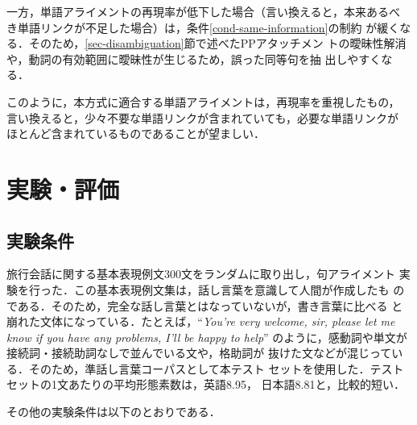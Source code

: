 一方，単語アライメントの再現率が低下した場合（言い換えると，本来あるべ
き単語リンクが不足した場合）は，条件\ref{cond-same-information}の制約
が緩くなる．そのため，\ref{sec-disambiguation}節で述べたPPアタッチメン
トの曖昧性解消や，動詞の有効範囲に曖昧性が生じるため，誤った同等句を抽
出しやすくなる．

このように，本方式に適合する単語アライメントは，再現率を重視したもの，
言い換えると，少々不要な単語リンクが含まれていても，必要な単語リンクが
ほとんど含まれているものであることが望ましい．


\section{実験・評価}
\label{sec-eval-alignment}

\subsection{実験条件}

旅行会話に関する基本表現例文300文をランダムに取り出し，句アライメント
実験を行った．この基本表現例文集は，話し言葉を意識して人間が作成したも
のである．そのため，完全な話し言葉とはなっていないが，書き言葉に比べる
と崩れた文体になっている．たとえば，``{\em You're very welcome, sir,
please let me know if you have any problems, I'll be happy to help}''
のように，感動詞や単文が接続詞・接続助詞なしで並んでいる文や，格助詞が
抜けた文などが混じっている．そのため，準話し言葉コーパスとして本テスト
セットを使用した．テストセットの1文あたりの平均形態素数は，英語8.95， 
日本語8.81と，比較的短い．

その他の実験条件は以下のとおりである．


